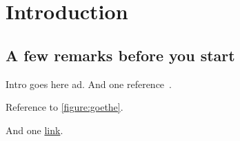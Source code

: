 \chapter{Introduction}\label{section:introduction}

\thispagestyle{myheadings}

	\section{A few remarks before you start}\label{section:introduction:history}

		Intro goes here  \Gls{ad}.
		And one reference~\cite{practical-ore}.

		

		Reference to \cref{figure:goethe}.

		And one \href{https://dbogatov.org}{link}.
